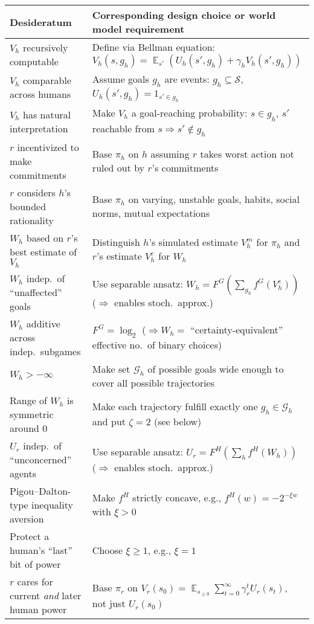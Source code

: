 \documentclass[letterpaper]{article} %
\DeclareMathOperator*{\E}{\mathbb{E}}
\def\G{\mathcal{G}}
\def\S{\mathcal{S}}
\begin{document}
\begin{table*}[]
    \centering
    \begin{tabular}{ll}
       \toprule
       \bf Desideratum  & \bf Corresponding design choice or world model requirement \\
       \midrule
       $V_h$ recursively computable & Define via Bellman equation: $V_h(s,g_h)=\E_{s'}(U_h(s',g_h)+\gamma_h V_h(s',g_h))$ \\
       $V_h$ comparable across humans
       & Assume goals $g_h$ are events: $g_h\subseteq\S$, $U_h(s',g_h)=1_{s'\in g_h}$ \\
       $V_h$ has natural interpretation & Make $V_h$ a goal-reaching probability: $s\in g_h$, $s'$ reachable from $s\Rightarrow s'\notin g_h$ \\
       \midrule 
       $r$ incentivized to make commitments & Base $\pi_h$ on $h$ assuming $r$ takes worst action not ruled out by $r$'s commitments \\
       $r$ considers $h$'s bounded rationality & Base $\pi_h$ on varying, unstable goals, habits, social norms, mutual expectations \\
       \midrule
       $W_h$ based on $r$'s best estimate of $V_h$ & Distinguish $h$'s simulated estimate $V^m_h$ for $\pi_h$ and $r$'s estimate $V^e_h$ for $W_h$ \\
       $W_h$ indep.~of ``unaffected'' goals & Use separable ansatz: $W_h = F^G(\sum_{g_h} f^G(V^e_h))$  ($\Rightarrow$ enables stoch.~approx.) \\
       $W_h$ additive across indep.~subgames & $F^G=\log_2$ ($\Rightarrow W_h=$ ``certainty-equivalent'' effective no.~of binary choices) \\
       $W_h>-\infty$ & Make set $\G_h$ of possible goals wide enough to cover all possible trajectories \\
       Range of $W_h$ is symmetric around 0 & Make each trajectory fulfill exactly one $g_h\in\G_h$ and put $\zeta=2$ (see below) \\ 
       \midrule
       $U_r$ indep.~of ``unconcerned'' agents & Use separable ansatz: $U_r = F^H(\sum_h f^H(W_h))$ ($\Rightarrow$ enables stoch.~approx.) \\
       Pigou--Dalton-type inequality aversion & Make $f^H$ strictly concave, e.g., $f^H(w)=-2^{-\xi w}$ with $\xi>0$ \\
       Protect a human's ``last'' bit of power & Choose $\xi\ge 1$, e.g., $\xi=1$ \\
       $r$ cares for current {\em and} later human power & Base $\pi_r$ on $V_r(s_0) = \E_{s_{\ge 0}} \sum_{t=0}^\infty \gamma_r^t U_r(s_t)$, not just $U_r(s_0)$ \\  

\end{tabular}
\end{table*}
\end{document}
